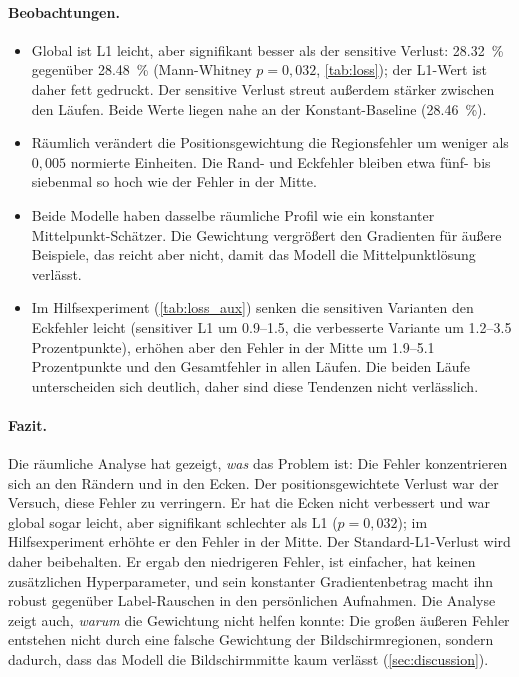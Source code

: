 \documentclass[
  11pt,
  a4paper,
  oneside,
  DIV=12,
  BCOR=8mm,
  parskip=half,
  headings=normal,
  bibliography=totoc,
  listof=totoc
]{scrreprt}
\begin{document}
\paragraph{Beobachtungen.}
\begin{itemize}[nosep]
  \item Global ist L1 leicht, aber signifikant besser als der sensitive
        Verlust: \SI{28,32}{\percent} gegenüber \SI{28,48}{\percent}
        (Mann-Whitney $p=0,032$, \cref{tab:loss}); der L1-Wert ist daher fett
        gedruckt. Der sensitive Verlust streut außerdem stärker zwischen den
        Läufen. Beide Werte liegen nahe an der Konstant-Baseline
        (\SI{28,46}{\percent}).
  \item Räumlich verändert die Positionsgewichtung die Regionsfehler um
        weniger als $0,005$ normierte Einheiten. Die Rand- und Eckfehler
        bleiben etwa fünf- bis siebenmal so hoch wie der Fehler in der Mitte.
  \item Beide Modelle haben dasselbe räumliche Profil wie ein konstanter
        Mittelpunkt-Schätzer. Die Gewichtung vergrößert den Gradienten für
        äußere Beispiele, das reicht aber nicht, damit das Modell die
        Mittelpunktlösung verlässt.
  \item Im Hilfsexperiment (\cref{tab:loss_aux}) senken die sensitiven
        Varianten den Eckfehler leicht (sensitiver L1 um
        \num{0,9}--\num{1,5}, die verbesserte Variante um
        \num{1,2}--\num{3,5} Prozentpunkte), erhöhen aber den Fehler in der
        Mitte um \num{1,9}--\num{5,1} Prozentpunkte und den Gesamtfehler in
        allen Läufen. Die beiden Läufe unterscheiden sich deutlich, daher sind
        diese Tendenzen nicht verlässlich.
\end{itemize}

\paragraph{Fazit.}
Die räumliche Analyse hat gezeigt, \emph{was} das Problem ist: Die Fehler
konzentrieren sich an den Rändern und in den Ecken. Der positionsgewichtete
Verlust war der Versuch, diese Fehler zu verringern. Er hat die Ecken nicht
verbessert und war global sogar leicht, aber signifikant schlechter als L1
($p=0,032$); im Hilfsexperiment erhöhte er den Fehler in der Mitte. Der
Standard-L1-Verlust wird daher beibehalten. Er ergab den niedrigeren Fehler,
ist einfacher, hat keinen zusätzlichen Hyperparameter, und sein konstanter
Gradientenbetrag macht ihn robust gegenüber Label-Rauschen in den
persönlichen Aufnahmen. Die Analyse zeigt auch, \emph{warum} die Gewichtung
nicht helfen konnte: Die großen äußeren Fehler entstehen nicht durch eine
falsche Gewichtung der Bildschirmregionen, sondern dadurch, dass das Modell
die Bildschirmmitte kaum verlässt (\cref{sec:discussion}).
\end{document}
